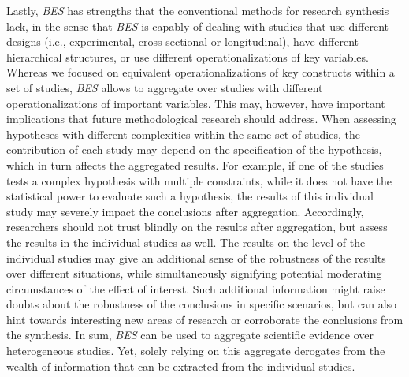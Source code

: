 \documentclass[review, 3p, authoryear]{elsarticle} %
\begin{document}
Lastly, \emph{BES} has strengths that the conventional methods for research synthesis lack, in the sense that \emph{BES} is capably of dealing with studies that use different designs (i.e., experimental, cross-sectional or longitudinal), have different hierarchical structures, or use different operationalizations of key variables.
Whereas we focused on equivalent operationalizations of key constructs within a set of studies, \emph{BES} allows to aggregate over studies with different operationalizations of important variables.
This may, however, have important implications that future methodological research should address.
When assessing hypotheses with different complexities within the same set of studies, the contribution of each study may depend on the specification of the hypothesis, which in turn affects the aggregated results.
For example, if one of the studies tests a complex hypothesis with multiple constraints, while it does not have the statistical power to evaluate such a hypothesis, the results of this individual study may severely impact the conclusions after aggregation.
Accordingly, researchers should not trust blindly on the results after aggregation, but assess the results in the individual studies as well.
The results on the level of the individual studies may give an additional sense of the robustness of the results over different situations, while simultaneously signifying potential moderating circumstances of the effect of interest.
Such additional information might raise doubts about the robustness of the conclusions in specific scenarios, but can also hint towards interesting new areas of research or corroborate the conclusions from the synthesis.
In sum, \emph{BES} can be used to aggregate scientific evidence over heterogeneous studies.
Yet, solely relying on this aggregate derogates from the wealth of information that can be extracted from the individual studies.


\end{document}
